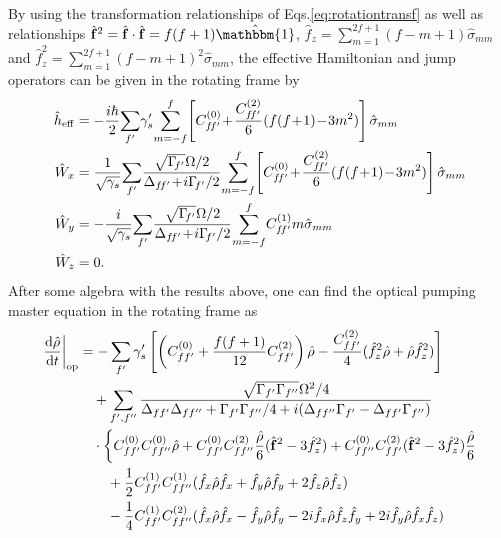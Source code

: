 \documentclass[preprint,aps,pra,onecolumn,superscriptaddress]{revtex4-1} %
\newcommand{\dt}[1]{\frac{{\mathrm d} {#1}}{{\mathrm d}t}}
\newcommand{\nn}{\nonumber}
\newcommand{\fo}{\hat{\mathbf{f}}}
\newcommand{\fx}{\hat{f}_x}
\newcommand{\fy}{\hat{f}_y}
\newcommand{\fz}{\hat{f}_z}
\newcommand{\rhoo}{\hat{\rho}}
\begin{document}
\begin{appendix}
By using the transformation relationships of Eqs.\eqref{eq:rotationtransf} as well as relationships $ \hat{\mathbf{f}}^2=\hat{\mathbf{f}}\cdot\hat{\mathbf{f}}=f(f+1)\hat{\mathbbm{1}} $, $ \hat{f}_z =\sum_{m=1}^{2f+1}(f-m+1)\hat{\sigma}_{mm} $ and $ \hat{f}_z^2 = \sum_{m=1}^{2f+1}(f-m+1)^2\hat{\sigma}_{mm} $, the effective Hamiltonian and jump operators can be given in the rotating frame by 
\begin{subequations}
\begin{align}
\hat{h}_{\rm eff} &= -\frac{i\hbar}{2} \!\sum_{f'}\! \gamma'_s \!\sum_{m=-f}^f\!\left[C_{f\!f'}^{(0)} \!+\! \frac{C_{f\!f'}^{(2) }}{6}(f(f\!+\!1)\!-\!3m^2) \right]\hat{\sigma}_{mm}\\
\hat{W}_{x} &= \frac{1}{\sqrt{\gamma_s}}\!\sum_{f'}\! \frac{\sqrt{\Gamma\!_{f'} }\Omega/2}{\Delta_{f\!f'}\!+\!i\Gamma\!_{f'}/2 } \!\sum_{m=-f}^f\!\left[C_{f\!f'}^{(0)} \!+\! \frac{C_{f\!f'}^{(2) }}{6}(f(f\!+\!1)\!-\!3m^2) \right]\hat{\sigma}_{mm}\\
\hat{W}_{y} &= -\frac{i}{\sqrt{\gamma_s}}\!\sum_{f'}\! \frac{\sqrt{\Gamma\!_{f'} }\Omega/2}{\Delta_{f\!f'}\!+\!i\Gamma\!_{f'}/2 } \!\sum_{m=-f}^f\! C_{f\!f'}^{(1)}m\hat{\sigma}_{mm}\\
\hat{W}_z &=0.
\end{align}
\end{subequations}
After some algebra with the results above, one can find the optical pumping master equation in the rotating frame as
\begin{align}
\left. \dt{\hat{\rho}}\right|_{\rm op} 
&= - \sum_{f'} \gamma'_s \left[\left(C_{ff'}^{(0)}+\frac{f(f+1)}{12}C_{ff'}^{(2)} \right)\hat{\rho}-\frac{C_{ff'}^{(2)}}{4}(\hat{f}_z^2\hat{\rho}+\hat{\rho}\hat{f}_z^2) \right]\nn\\
&\quad+\sum_{f',f''} \frac{\sqrt{\Gamma_{f'}\Gamma_{f''} }\Omega^2/4 }{\Delta_{ff'}\Delta_{ff''}+\Gamma_{f'}\Gamma_{f''}/4+i(\Delta_{ff''}\Gamma_{f'}-\Delta_{ff'}\Gamma_{f''} ) }\nn\\
&\quad\cdot\left\{C_{ff'}^{(0)}C_{ff''}^{(0)}\hat{\rho}+ C_{ff'}^{(0)}C_{ff''}^{(2)}\frac{\hat{\rho}}{6}(\fo^2-3\hat{f}_z^2) + C_{ff''}^{(0)}C_{ff'}^{(2)}(\fo^2-3\hat{f}_z^2)\frac{\hat{\rho}}{6} \right.\nn\\
&\quad\quad + \frac{1}{2}C_{ff'}^{(1)}C_{ff''}^{(1)}(\hat{f}_x\hat{\rho}\hat{f}_x+\hat{f}_y\hat{\rho}\hat{f}_y+2\hat{f}_z\hat{\rho}\hat{f}_z )\nn\\
&\quad\quad -\frac{1}{4}C_{ff'}^{(1)}C_{ff''}^{(2)}(\fx\rhoo\fx-\fy\rhoo\fy-2i\fx\rhoo\fz\fy+2i\fy\rhoo\fx\fz )\nn\\

\end{align}
\end{appendix}
\end{document}
